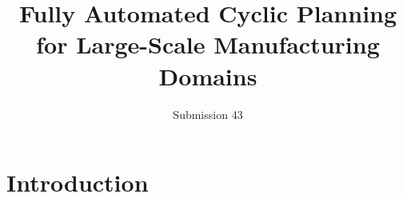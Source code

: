 \documentclass[10pt,letterpaper]{article}
\author{Submission 43}
\title{Fully Automated Cyclic Planning for Large-Scale Manufacturing Domains}
\theoremstyle{definition}
\begin{document}
\maketitle
\begin{abstract}

\end{abstract}

\section{Introduction}




\fontsize{9.5pt}{10.5pt}
\selectfont


\end{document}

